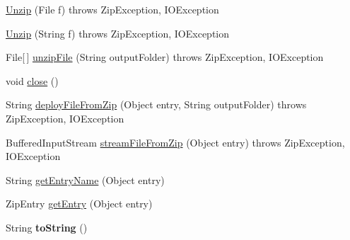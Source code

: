 \begin{DoxyCompactItemize}
\item 
\hyperlink{class_c_a_s_u_a_l_1_1archiving_1_1_unzip_a88ff2e111af2352f8101ea87acc2d6d4}{Unzip} (File f)  throws Zip\-Exception, I\-O\-Exception 
\item 
\hyperlink{class_c_a_s_u_a_l_1_1archiving_1_1_unzip_abc708c4bf25ed0e0edeabf0c71bbd344}{Unzip} (String f)  throws Zip\-Exception, I\-O\-Exception 
\item 
File\mbox{[}$\,$\mbox{]} \hyperlink{class_c_a_s_u_a_l_1_1archiving_1_1_unzip_ad4e2cb0ca56505d6acce008446d76188}{unzip\-File} (String output\-Folder)  throws Zip\-Exception, I\-O\-Exception 
\item 
void \hyperlink{class_c_a_s_u_a_l_1_1archiving_1_1_unzip_a14b0d899780a66d69b01ac7034d4a90e}{close} ()
\item 
String \hyperlink{class_c_a_s_u_a_l_1_1archiving_1_1_unzip_a568a39dbfeb9064924d41b441da6e454}{deploy\-File\-From\-Zip} (Object entry, String output\-Folder)  throws Zip\-Exception, I\-O\-Exception 
\item 
Buffered\-Input\-Stream \hyperlink{class_c_a_s_u_a_l_1_1archiving_1_1_unzip_a285658d9e0121e2859a2c35600a0c9d0}{stream\-File\-From\-Zip} (Object entry)  throws Zip\-Exception, I\-O\-Exception 
\item 
String \hyperlink{class_c_a_s_u_a_l_1_1archiving_1_1_unzip_a750b1ed907dfd4da6931289e53094754}{get\-Entry\-Name} (Object entry)
\item 
Zip\-Entry \hyperlink{class_c_a_s_u_a_l_1_1archiving_1_1_unzip_aebf6db26bcbca3b4f76833f8372c6302}{get\-Entry} (Object entry)
\item 
\hypertarget{class_c_a_s_u_a_l_1_1archiving_1_1_unzip_a877ef83929ff90391a6833da374136c8}{String {\bfseries to\-String} ()}\label{class_c_a_s_u_a_l_1_1archiving_1_1_unzip_a877ef83929ff90391a6833da374136c8}

\end{DoxyCompactItemize}

